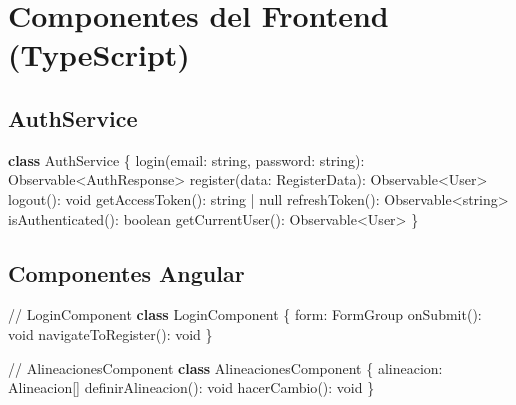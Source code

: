 \documentclass[
  spanish,
  11pt,
  letterpaper,
]{book}
\newenvironment{Shaded}{\begin{snugshade}}{\end{snugshade}}
\newcommand{\CommentTok}[1]{\textcolor[rgb]{0.37,0.37,0.37}{#1}}
\newcommand{\DataTypeTok}[1]{\textcolor[rgb]{0.68,0.00,0.00}{#1}}
\newcommand{\FunctionTok}[1]{\textcolor[rgb]{0.28,0.35,0.67}{#1}}
\newcommand{\KeywordTok}[1]{\textcolor[rgb]{0.00,0.23,0.31}{\textbf{#1}}}
\newcommand{\NormalTok}[1]{\textcolor[rgb]{0.00,0.23,0.31}{#1}}
\newcommand{\OperatorTok}[1]{\textcolor[rgb]{0.37,0.37,0.37}{#1}}
\begin{document}
\section{Componentes del Frontend
(TypeScript)}\label{componentes-del-frontend-typescript}

\subsection{AuthService}\label{authservice}

\begin{Shaded}
\begin{Highlighting}[]
\KeywordTok{class}\NormalTok{ AuthService \{}
  \FunctionTok{login}\NormalTok{(email}\OperatorTok{:} \DataTypeTok{string}\OperatorTok{,}\NormalTok{ password}\OperatorTok{:} \DataTypeTok{string}\NormalTok{)}\OperatorTok{:}\NormalTok{ Observable}\OperatorTok{\textless{}}\NormalTok{AuthResponse}\OperatorTok{\textgreater{}}
  \FunctionTok{register}\NormalTok{(data}\OperatorTok{:}\NormalTok{ RegisterData)}\OperatorTok{:}\NormalTok{ Observable}\OperatorTok{\textless{}}\NormalTok{User}\OperatorTok{\textgreater{}}
  \FunctionTok{logout}\NormalTok{()}\OperatorTok{:} \DataTypeTok{void}
  \FunctionTok{getAccessToken}\NormalTok{()}\OperatorTok{:} \DataTypeTok{string} \OperatorTok{|} \DataTypeTok{null}
  \FunctionTok{refreshToken}\NormalTok{()}\OperatorTok{:}\NormalTok{ Observable}\OperatorTok{\textless{}}\DataTypeTok{string}\OperatorTok{\textgreater{}}
  \FunctionTok{isAuthenticated}\NormalTok{()}\OperatorTok{:} \DataTypeTok{boolean}
  \FunctionTok{getCurrentUser}\NormalTok{()}\OperatorTok{:}\NormalTok{ Observable}\OperatorTok{\textless{}}\NormalTok{User}\OperatorTok{\textgreater{}}
\NormalTok{\}}
\end{Highlighting}
\end{Shaded}

\subsection{Componentes Angular}\label{componentes-angular}

\begin{Shaded}
\begin{Highlighting}[]
\CommentTok{// LoginComponent}
\KeywordTok{class}\NormalTok{ LoginComponent \{}
\NormalTok{  form}\OperatorTok{:}\NormalTok{ FormGroup}
  \FunctionTok{onSubmit}\NormalTok{()}\OperatorTok{:} \DataTypeTok{void}
  \FunctionTok{navigateToRegister}\NormalTok{()}\OperatorTok{:} \DataTypeTok{void}
\NormalTok{\}}

\CommentTok{// AlineacionesComponent}
\KeywordTok{class}\NormalTok{ AlineacionesComponent \{}
\NormalTok{  alineacion}\OperatorTok{:}\NormalTok{ Alineacion[]}
  \FunctionTok{definirAlineacion}\NormalTok{()}\OperatorTok{:} \DataTypeTok{void}
  \FunctionTok{hacerCambio}\NormalTok{()}\OperatorTok{:} \DataTypeTok{void}
\NormalTok{\}}
\end{Highlighting}
\end{Shaded}
\end{document}
